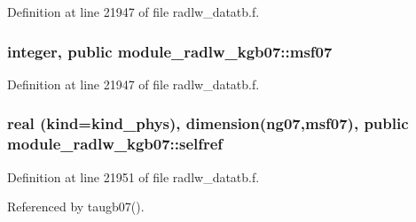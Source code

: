 Definition at line 21947 of file radlw\+\_\+datatb.\+f.

\subsubsection[{\texorpdfstring{msf07}{msf07}}]{\setlength{\rightskip}{0pt plus 5cm}integer, public module\+\_\+radlw\+\_\+kgb07\+::msf07}\hypertarget{namespacemodule__radlw__kgb07_a9310f33501467fbadcf092d71559358b}{}\label{namespacemodule__radlw__kgb07_a9310f33501467fbadcf092d71559358b}


Definition at line 21947 of file radlw\+\_\+datatb.\+f.

\subsubsection[{\texorpdfstring{selfref}{selfref}}]{\setlength{\rightskip}{0pt plus 5cm}real (kind=kind\+\_\+phys), dimension(ng07,{\bf msf07}), public module\+\_\+radlw\+\_\+kgb07\+::selfref}\hypertarget{namespacemodule__radlw__kgb07_aaf6d41f390a0465af92756b9c3e6c558}{}\label{namespacemodule__radlw__kgb07_aaf6d41f390a0465af92756b9c3e6c558}


Definition at line 21951 of file radlw\+\_\+datatb.\+f.



Referenced by taugb07().

